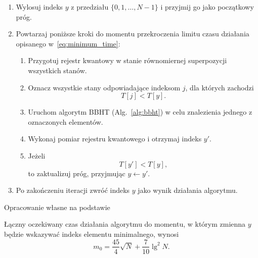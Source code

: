 \begin{algorithm}[H]
\caption{Kwantowy algorytm wyszukiwania minimum}
\label{alg:quantum_minimum}
\begin{enumerate}

    \item Wylosuj indeks $y$ z przedziału
    $\{0,1,\ldots,N-1\}$ i przyjmij go jako początkowy próg.

    \item Powtarzaj poniższe kroki do momentu przekroczenia limitu
    czasu działania opisanego w~\eqref{eq:minimum_time}:
    
    \begin{enumerate}
        \item Przygotuj rejestr kwantowy w stanie równomiernej
        superpozycji wszystkich stanów.

        \item Oznacz wszystkie stany odpowiadające indeksom $j$,
        dla których zachodzi
        \[
            T[j] < T[y].
        \]

        \item Uruchom algorytm BBHT (Alg.~\ref{alg:bbht}) w celu znalezienia jednego
        z oznaczonych elementów.

        \item Wykonaj pomiar rejestru kwantowego i otrzymaj indeks $y'$.

        \item Jeżeli
        \[
            T[y'] < T[y],
        \]
        to zaktualizuj próg, przyjmując $y \leftarrow y'$.
    \end{enumerate}

    \item Po zakończeniu iteracji zwróć indeks $y$ jako wynik
    działania algorytmu.

\end{enumerate}
\begin{center}
\small Opracowanie własne na podstawie \cite{duerr1996}
\end{center}

\end{algorithm}

Łączny oczekiwany czas działania algorytmu do momentu, w którym zmienna $y$ będzie wskazywać indeks elementu minimalnego, wynosi\cite{duerr1996}
\begin{equation}
\label{eq:minimum_time} 
m_0=\frac{45}{4}\sqrt{N}+\frac{7}{10}\lg^2 N.
\end{equation}

